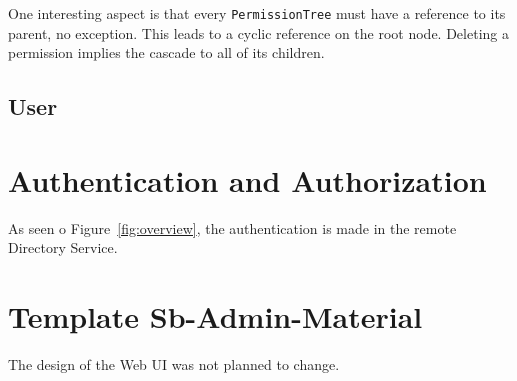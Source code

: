 One interesting aspect is that every \texttt{PermissionTree} must have a reference to its parent, no exception. This leads to a cyclic reference on the root node. Deleting a permission implies the cascade to all of its children.
\subsection{User}\label{model:user}

\section{Authentication and Authorization}\label{proj:auth}
As seen o Figure~\ref{fig:overview}, the authentication is made in the remote Directory Service. 

\section{Template Sb-Admin-Material}
The design of the Web \gls{UI} was not planned to change. 